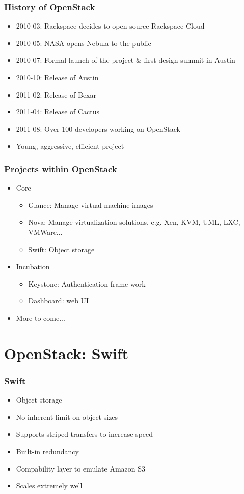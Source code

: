 \documentclass[t]{beamer}
\begin{document}
\begin{frame}
	\frametitle{History of OpenStack}
	\begin{itemize}
		\item 2010-03: Rackspace decides to open source Rackspace Cloud
		\item 2010-05: NASA opens Nebula to the public
		\item 2010-07: Formal launch of the project \& first design summit in Austin
		\item 2010-10: Release of Austin
		\item 2011-02: Release of Bexar
		\item 2011-04: Release of Cactus
		\item 2011-08: Over 100 developers working on OpenStack
		\item Young, aggressive, efficient project
	\end{itemize}
\end{frame}

\begin{frame}
	\frametitle{Projects within OpenStack}
	\begin{itemize}
		\item Core
		\begin{itemize}
			\item Glance: Manage virtual machine images
			\item Nova: Manage virtualization solutions, e.g. Xen, KVM, UML, LXC, VMWare...
			\item Swift: Object storage
		\end{itemize}
		\item Incubation
		\begin{itemize}
			\item Keystone: Authentication frame-work
			\item Dashboard: web UI
		\end{itemize}
		\item More to come...
	\end{itemize}
\end{frame}


\section{OpenStack: Swift}

\begin{frame}
	\frametitle{Swift}
	\begin{itemize}
		\item Object storage
		\item No inherent limit on object sizes
		\item Supports striped transfers to increase speed
		\item Built-in redundancy
		\item Compability layer to emulate Amazon S3
		\item Scales extremely well
	\end{itemize}
\end{frame}
\end{document}
